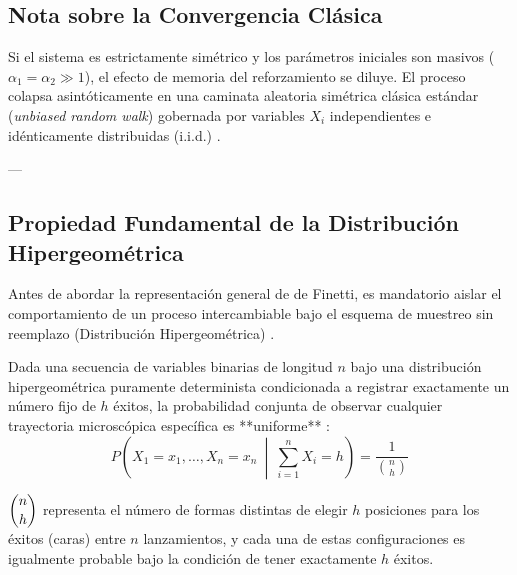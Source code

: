 \subsection*{Nota sobre la Convergencia Clásica}
Si el sistema es estrictamente simétrico y los parámetros iniciales son masivos ($\alpha_1 = \alpha_2 \gg 1$), el efecto de memoria del reforzamiento se diluye. El proceso colapsa asintóticamente en una caminata aleatoria simétrica clásica estándar (\textit{unbiased random walk}) gobernada por variables $X_i$ independientes e idénticamente distribuidas (i.i.d.) .

---

\subsection{Propiedad Fundamental de la Distribución Hipergeométrica}

Antes de abordar la representación general de de Finetti, es mandatorio aislar el comportamiento de un proceso intercambiable bajo el esquema de muestreo sin reemplazo (Distribución Hipergeométrica) . 

\begin{lema}
Dada una secuencia de variables binarias de longitud $n$ bajo una distribución hipergeométrica puramente determinista condicionada a registrar exactamente un número fijo de $h$ éxitos, la probabilidad conjunta de observar cualquier trayectoria microscópica específica es **uniforme** :
\begin{equation*}
    P\left(X_1 = x_1, \dots, X_n = x_n \ \middle| \ \sum_{i=1}^{n} X_i = h\right) = \frac{1}{\binom{n}{h}} 
\end{equation*}
\end{lema}


\begin{observacion}
    $\dbinom{n}{h}$ representa el número de formas distintas de elegir $h$ posiciones para los éxitos (caras) entre $n$ lanzamientos, y cada una de estas configuraciones es igualmente probable bajo la condición de tener exactamente $h$ éxitos.
\end{observacion}

